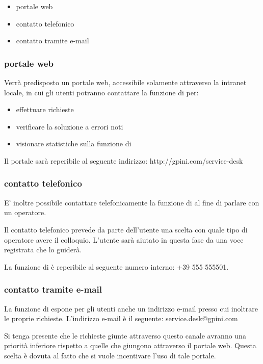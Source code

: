\begin{itemize}
\item{portale web}
\item{contatto telefonico}
\item{contatto tramite e-mail}
\end{itemize}

\subsubsection[Portale Web]{portale web}
Verrà predisposto un portale web, accessibile solamente attraverso la intranet locale, in cui gli utenti potranno contattare la funzione di  per:

\begin{itemize}
\item{effettuare richieste}
\item{verificare la soluzione a errori noti}
\item{visionare statistiche sulla funzione di }
\end{itemize}

Il portale sarà reperibile al seguente indirizzo: http://gpini.com/service-desk

\subsubsection[Contatto telefonico]{contatto telefonico}
E' inoltre possibile contattare telefonicamente la funzione di  al fine di parlare con un operatore. 

Il contatto telefonico prevede da parte dell'utente una scelta con quale tipo di operatore avere il colloquio. L'utente sarà aiutato in questa fase da una voce registrata che lo guiderà.

La funzione di  è reperibile al seguente numero interno: +39 555 555501.

\subsubsection[Contatto tramite e-mail]{contatto tramite e-mail}
La funzione di  espone per gli utenti anche un indirizzo e-mail presso cui inoltrare le proprie richieste. L'indirizzo e-mail è il seguente: service.desk@gpini.com

Si tenga presente che le richieste giunte attraverso questo canale avranno una priorità inferiore rispetto a quelle che giungono attraverso il portale web. Questa scelta è dovuta al fatto che si vuole incentivare l'uso di tale portale.